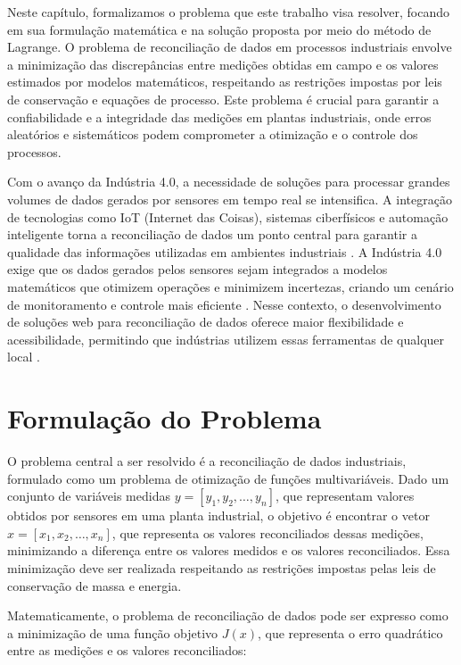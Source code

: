 \label{Cap:Problema}

Neste capítulo, formalizamos o problema que este trabalho visa resolver, focando em sua formulação matemática e na solução proposta por meio do método de Lagrange. O problema de reconciliação de dados em processos industriais envolve a minimização das discrepâncias entre medições obtidas em campo e os valores estimados por modelos matemáticos, respeitando as restrições impostas por leis de conservação e equações de processo. Este problema é crucial para garantir a confiabilidade e a integridade das medições em plantas industriais, onde erros aleatórios e sistemáticos podem comprometer a otimização e o controle dos processos.

Com o avanço da Indústria 4.0, a necessidade de soluções para processar grandes volumes de dados gerados por sensores em tempo real se intensifica. A integração de tecnologias como IoT (Internet das Coisas), sistemas ciberfísicos e automação inteligente torna a reconciliação de dados um ponto central para garantir a qualidade das informações utilizadas em ambientes industriais \cite{industry40}. A Indústria 4.0 exige que os dados gerados pelos sensores sejam integrados a modelos matemáticos que otimizem operações e minimizem incertezas, criando um cenário de monitoramento e controle mais eficiente \cite{datareconciliationindustry4}. Nesse contexto, o desenvolvimento de soluções web para reconciliação de dados oferece maior flexibilidade e acessibilidade, permitindo que indústrias utilizem essas ferramentas de qualquer local \cite{websolutions}.

\section{Formulação do Problema}
\label{Sec:FormulacaoProblema}

O problema central a ser resolvido é a reconciliação de dados industriais, formulado como um problema de otimização de funções multivariáveis. Dado um conjunto de variáveis medidas $y = [y_1, y_2, \dots, y_n]$, que representam valores obtidos por sensores em uma planta industrial, o objetivo é encontrar o vetor $x = [x_1, x_2, \dots, x_n]$, que representa os valores reconciliados dessas medições, minimizando a diferença entre os valores medidos e os valores reconciliados. Essa minimização deve ser realizada respeitando as restrições impostas pelas leis de conservação de massa e energia.

Matematicamente, o problema de reconciliação de dados pode ser expresso como a minimização de uma função objetivo $J(x)$, que representa o erro quadrático entre as medições e os valores reconciliados:

